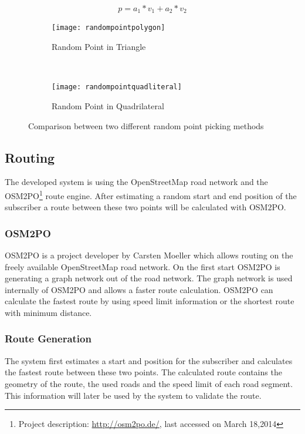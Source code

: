 \begin{equation}
	p=a_1*v_1+a_2*v_2
	\label{eq:randquad}
\end{equation}


\begin{figure}
	\centering
	\begin{subfigure}[b]{0.45\textwidth}
		\texttt{[image: randompointpolygon]}
		\caption{Random Point in Triangle}
		\label{fig:randtriangle}
	\end{subfigure}%
	~ %
	\begin{subfigure}[b]{0.45\textwidth}
		\texttt{[image: randompointquadliteral]}
		\caption{Random Point in  Quadrilateral}
		\label{fig:quadrilateral}
	\end{subfigure}
	   
	\caption{Comparison between two different random point picking methods}
	\label{fig:comprandom}
\end{figure}

\subsection{Routing}
The developed system is using the OpenStreetMap road network and the OSM2PO\footnote{Project description: \url{http://osm2po.de/}, last accessed on March 18,2014} route engine. After estimating a random start and end position of the subscriber a route between these two points will be calculated with OSM2PO.

\subsubsection{OSM2PO}
OSM2PO is a project developer by Carsten Moeller which allows routing on the freely available OpenStreetMap road network. On the first start OSM2PO is generating a graph network out of the road network. The graph network is used internally of OSM2PO and allows a faster route calculation. OSM2PO can calculate the fastest route by using speed limit information or the shortest route with minimum distance.
\subsubsection{Route Generation}
The system first estimates a start and position for the subscriber and calculates the fastest route between these two points. The calculated route contains the geometry of the route, the used roads and the speed limit of each road segment. This information will later be used by the system to validate the route.
